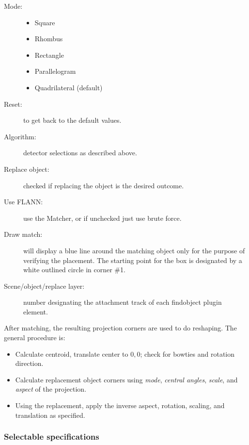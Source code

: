 \begin{description}
    \item[Mode:]
    \begin{itemize}[noitemsep]
        \item Square
        \item Rhombus
        \item Rectangle
        \item Parallelogram
        \item Quadrilateral (default)
    \end{itemize}
    \item[Reset:] to get back to the default values.
    \item[Algorithm:] detector selections as described above.
    \item[Replace object:] checked if replacing the object is the desired outcome.
    \item[Use FLANN:] use the Matcher, or if unchecked just use brute force.
    \item[Draw match:] will display a blue line around the matching object only for the purpose of verifying the placement. The starting point for the box is designated by a white outlined circle in corner \#1.
    \item[Scene/object/replace layer:] number designating the attachment track of each findobject plugin element.
\end{description}

After matching, the resulting projection corners are used to do reshaping. The general procedure is:

\begin{itemize}[noitemsep]
    \item Calculate centroid, translate center to $0,0$; check for bowties and rotation direction.
    \item Calculate replacement object corners using \textit{mode}, \textit{central angles}, \textit{scale}, and \textit{aspect} of the projection.
    \item Using the replacement, apply the inverse aspect, rotation, scaling, and translation as specified.
\end{itemize}

\subsubsection*{Selectable specifications}%
\label{ssub:selectable_specifications}

